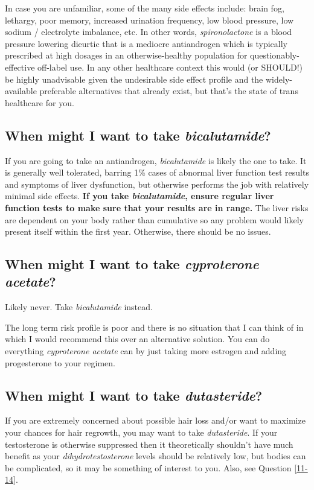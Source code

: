 \documentclass{article}
\begin{document}
{{In case you are unfamiliar, some of the many side effects include: brain fog, lethargy, poor memory, increased urination frequency, low blood pressure, low sodium / electrolyte imbalance, etc. In other words, \textit{spironolactone} is a blood pressure lowering dieurtic that is a mediocre antiandrogen which is typically prescribed at high dosages in an otherwise-healthy population for questionably-effective off-label use. In any other healthcare context this would (or SHOULD!) be highly unadvisable given the undesirable side effect profile and the widely-available preferable alternatives that already exist, but that's the state of trans healthcare for you.

\subsection{When might I want to take \textit{bicalutamide}?}

If you are going to take an antiandrogen, \textit{bicalutamide} is likely the one to take. It is generally well tolerated, barring 1\% cases of abnormal liver function test results and symptoms of liver dysfunction, but otherwise performs the job with relatively minimal side effects. \textbf{If you take \textit{bicalutamide}, ensure regular liver function tests to make sure that your results are in range. }The liver risks are dependent on your body rather than cumulative so any problem would likely present itself within the first year. Otherwise, there should be no issues. 

\subsection{When might I want to take \textit{cyproterone acetate}?}

Likely never. Take \textit{bicalutamide} instead.

The long term risk profile is poor and there is no situation that I can think of in which I would recommend this over an alternative solution. You can do everything \textit{cyproterone acetate} can by just taking more estrogen and adding progesterone to your regimen.

\subsection{When might I want to take \textit{dutasteride}?}

If you are extremely concerned about possible hair loss and/or want to maximize your chances for hair regrowth, you may want to take \textit{dutasteride}. If your testosterone is otherwise suppressed then it theoretically shouldn’t have much benefit as your \textit{dihydrotestosterone} levels should be relatively low, but bodies can be complicated, so it may be something of interest to you. Also, see Question \ref{11-14}.

}}
\end{document}
